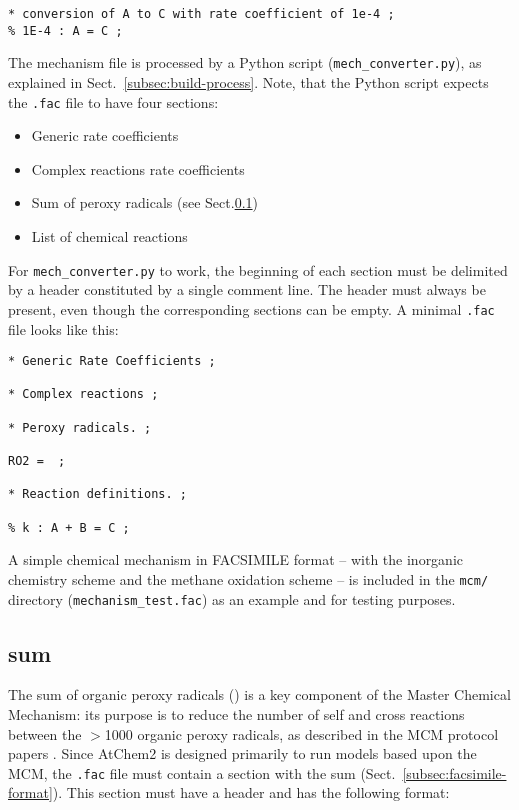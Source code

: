 \begin{verbatim}
* conversion of A to C with rate coefficient of 1e-4 ;
% 1E-4 : A = C ;
\end{verbatim}

The mechanism file is processed by a Python script (\texttt{mech\_converter.py}),
as explained in Sect.~\ref{subsec:build-process}. Note, that the Python script
expects the \texttt{.fac} file to have four sections:

\begin{itemize}
\item Generic rate coefficients
\item Complex reactions rate coefficients
\item Sum of peroxy radicals (see Sect.\ref{subsec:ro2-sum})
\item List of chemical reactions
\end{itemize}

For \texttt{mech\_converter.py} to work, the beginning of each section
must be delimited by a header constituted by a single comment line.
The header must always be present, even though the corresponding
sections can be empty. A minimal \texttt{.fac} file looks like this:

\begin{verbatim}
* Generic Rate Coefficients ;

* Complex reactions ;

* Peroxy radicals. ;

RO2 =  ;

* Reaction definitions. ;

% k : A + B = C ;
\end{verbatim}

A simple chemical mechanism in FACSIMILE format -- with the inorganic
chemistry scheme and the methane oxidation scheme -- is included in
the \texttt{mcm/} directory (\texttt{mechanism\_test.fac}) as an
example and for testing purposes.

\subsection{ sum} \label{subsec:ro2-sum}

The sum of organic peroxy radicals () is a key component of
the Master Chemical Mechanism: its purpose is to reduce the number of
self and cross reactions between the $>$1000 organic peroxy radicals,
as described in the MCM protocol papers \citep{Jenkin_1997,
  Saunders_2003}. Since AtChem2 is designed primarily to run models
based upon the MCM, the \texttt{.fac} file must contain a section with
the  sum (Sect.~\ref{subsec:facsimile-format}). This section
must have a header and has the following format:

